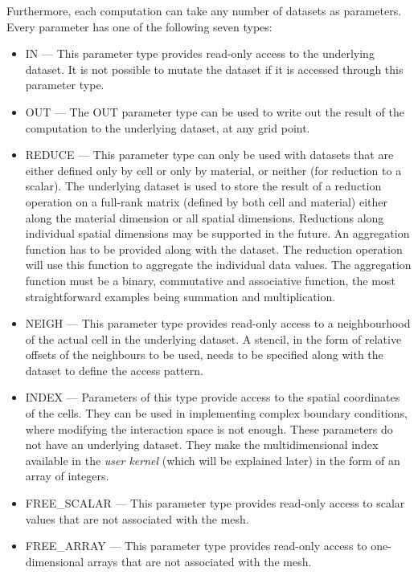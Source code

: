 \documentclass[fontsize=11pt, appendixprefix=true]{scrreprt}
\begin{document}
Furthermore, each computation can take any number of datasets as parameters.
Every parameter has one of the following seven types:

\begin{itemize}
  \item IN --- This parameter type provides read-only access to the underlying
    dataset. It is not possible to mutate the dataset if it is accessed through
    this parameter type.
  \item OUT --- The OUT parameter type can be used to write out the result of
    the computation to the underlying dataset, at any grid point.
  \item REDUCE --- This parameter type can only be used with datasets that are
    either defined only by cell or only by material, or neither (for reduction
    to a scalar).  The underlying dataset is used to store the result of a
    reduction operation on a full-rank matrix (defined by both cell and
    material) either along the material dimension or all spatial
    dimensions. Reductions along individual spatial dimensions may be supported
    in the future. An aggregation function has to be provided along with the
    dataset. The reduction operation will use this function to aggregate the
    individual data values. The aggregation function must be a binary,
    commutative and associative function, the most straightforward examples
    being summation and multiplication.
  \item NEIGH --- This parameter type provides read-only access to a
    neighbourhood of the actual cell in the underlying dataset. A stencil, in
    the form of relative offsets of the neighbours to be used, needs to be
    specified along with the dataset to define the access pattern.
  \item INDEX --- Parameters of this type provide access to the spatial
    coordinates of the cells.  They can be used in implementing complex boundary
    conditions, where modifying the interaction space is not enough.  These
    parameters do not have an underlying dataset. They make the multidimensional
    index available in the \textit{user kernel} (which will be explained later)
    in the form of an array of integers.
  \item FREE\_SCALAR --- This parameter type provides read-only access to scalar
    values that are not associated with the mesh.
  \item FREE\_ARRAY --- This parameter type provides read-only access to
    one-dimensional arrays that are not associated with the mesh.
\end{itemize}
\end{document}
